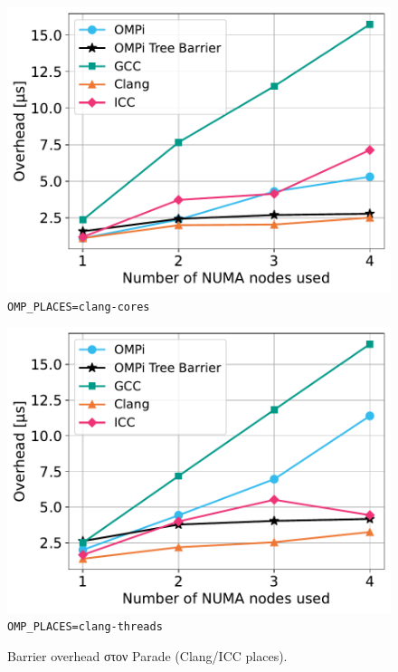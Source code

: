\begin{figure}
    \centering
    \begin{minipage}{0.5\textwidth}
        \centering
        \includegraphics[width=1\textwidth]{Figures/epcc_20210823_175412/clang-places_cores_close.pdf}
		\texttt{OMP\_PLACES=clang-cores}
    \end{minipage}\hfill
    \begin{minipage}{0.5\textwidth}
        \centering
        \includegraphics[width=1\textwidth]{Figures/epcc_20210823_175412/clang-places_threads_close.pdf}
        \texttt{OMP\_PLACES=clang-threads}
    \end{minipage}
    \caption{Barrier overhead στον Parade (Clang/ICC places).}
    \label{fig:bo-parade-clang-places}
\end{figure}



